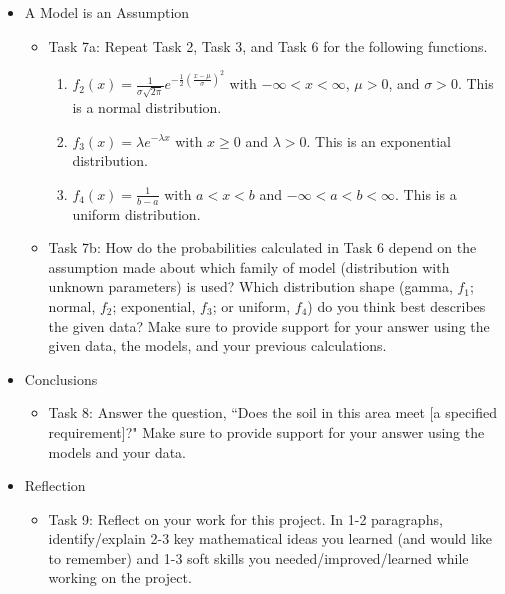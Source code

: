 \documentclass{article}
\theoremstyle{plain}
\theoremstyle{box}
\begin{document}
\begin{itemize}
\begin{itemize}
\begin{itemize}
		\item What is the 90$^{\text{th}}$ percentile of the distribution? Use the uniroot() function in R. (If you calculated this value using the pdf, check your answer using the closed form of the cdf. If you calculated this value with the closed form of the cdf, check your answer using the pdf.)		
		\end{itemize}
	\end{itemize}
\item A Model is an Assumption
	\begin{itemize}
	\item Task 7a: Repeat Task 2, Task 3, and Task 6 for the following functions.
		\begin{enumerate}
		\item $f_2(x) = \frac{1}{\sigma\sqrt{2\pi}}e^{-\frac{1}{2}(\frac{x-\mu}{\sigma})^2}$ with $-\infty < x < \infty$, $\mu > 0$, and $\sigma > 0$. This is a normal distribution.
		\item $f_3(x) = \lambda e^{-\lambda x}$ with $x \geq 0$ and $\lambda > 0$. This is an exponential distribution.
		\item $f_4(x) = \frac{1}{b-a}$ with $a < x < b$ and $-\infty < a < b <\infty$. This is a uniform distribution.
		\end{enumerate}
	\item Task 7b: How do the probabilities calculated in Task 6 depend on the assumption made about which family of model (distribution with unknown parameters) is used? Which distribution shape (gamma, $f_1$; normal, $f_2$; exponential, $f_3$; or uniform, $f_4$) do you think best describes the given data? Make sure to provide support for your answer using the given data, the models, and your previous calculations. 
	\end{itemize}
\item Conclusions
	\begin{itemize}
	\item Task 8: Answer the question, ``Does the soil in this area meet [a specified requirement]?" Make sure to provide support for your answer using the models and your data. 
	\end{itemize}
\item Reflection
	\begin{itemize}
	\item Task 9: Reflect on your work for this project. In 1-2 paragraphs, identify/explain 2-3 key mathematical  ideas you learned (and would like to remember) and 1-3 soft skills you needed/improved/learned while working on the project.
	\end{itemize}
\end{itemize}
 
\end{document}
